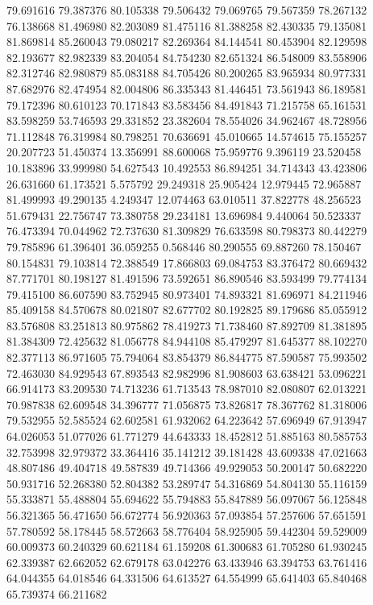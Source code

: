 79.691616
79.387376
80.105338
79.506432
79.069765
79.567359
78.267132
76.138668
81.496980
82.203089
81.475116
81.388258
82.430335
79.135081
81.869814
85.260043
79.080217
82.269364
84.144541
80.453904
82.129598
82.193677
82.982339
83.204054
84.754230
82.651324
86.548009
83.558906
82.312746
82.980879
85.083188
84.705426
80.200265
83.965934
80.977331
87.682976
82.474954
82.004806
86.335343
81.446451
73.561943
86.189581
79.172396
80.610123
70.171843
83.583456
84.491843
71.215758
65.161531
83.598259
53.746593
29.331852
23.382604
78.554026
34.962467
48.728956
71.112848
76.319984
80.798251
70.636691
45.010665
14.574615
75.155257
20.207723
51.450374
13.356991
88.600068
75.959776
9.396119
23.520458
10.183896
33.999980
54.627543
10.492553
86.894251
34.714343
43.423806
26.631660
61.173521
5.575792
29.249318
25.905424
12.979445
72.965887
81.499993
49.290135
4.249347
12.074463
63.010511
37.822778
48.256523
51.679431
22.756747
73.380758
29.234181
13.696984
9.440064
50.523337
76.473394
70.044962
72.737630
81.309829
76.633598
80.798373
80.442279
79.785896
61.396401
36.059255
0.568446
80.290555
69.887260
78.150467
80.154831
79.103814
72.388549
17.866803
69.084753
83.376472
80.669432
87.771701
80.198127
81.491596
73.592651
86.890546
83.593499
79.774134
79.415100
86.607590
83.752945
80.973401
74.893321
81.696971
84.211946
85.409158
84.570678
80.021807
82.677702
80.192825
89.179686
85.055912
83.576808
83.251813
80.975862
78.419273
71.738460
87.892709
81.381895
81.384309
72.425632
81.056778
84.944108
85.479297
81.645377
88.102270
82.377113
86.971605
75.794064
83.854379
86.844775
87.590587
75.993502
72.463030
84.929543
67.893543
82.982996
81.908603
63.638421
53.096221
66.914173
83.209530
74.713236
61.713543
78.987010
82.080807
62.013221
70.987838
62.609548
34.396777
71.056875
73.826817
78.367762
81.318006
79.532955
52.585524
62.602581
61.932062
64.223642
57.696949
67.913947
64.026053
51.077026
61.771279
44.643333
18.452812
51.885163
80.585753
32.753998
32.979372
33.364416
35.141212
39.181428
43.609338
47.021663
48.807486
49.404718
49.587839
49.714366
49.929053
50.200147
50.682220
50.931716
52.268380
52.804382
53.289747
54.316869
54.804130
55.116159
55.333871
55.488804
55.694622
55.794883
55.847889
56.097067
56.125848
56.321365
56.471650
56.672774
56.920363
57.093854
57.257606
57.651591
57.780592
58.178445
58.572663
58.776404
58.925905
59.442304
59.529009
60.009373
60.240329
60.621184
61.159208
61.300683
61.705280
61.930245
62.339387
62.662052
62.679178
63.042276
63.433946
63.394753
63.761416
64.044355
64.018546
64.331506
64.613527
64.554999
65.641403
65.840468
65.739374
66.211682
